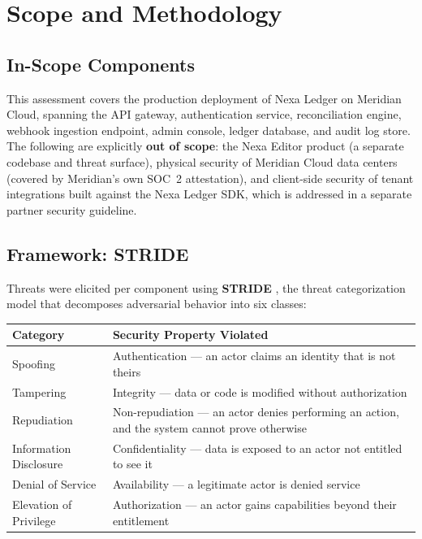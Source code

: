 \section{Scope and Methodology}
\label{sec:scope-methodology}

\subsection{In-Scope Components}

This assessment covers the production deployment of Nexa Ledger on Meridian Cloud, spanning the API gateway, authentication service, reconciliation engine, webhook ingestion endpoint, admin console, ledger database, and audit log store. The following are explicitly \textbf{out of scope}: the Nexa Editor product (a separate codebase and threat surface), physical security of Meridian Cloud data centers (covered by Meridian's own SOC~2 attestation), and client-side security of tenant integrations built against the Nexa Ledger SDK, which is addressed in a separate partner security guideline.

\subsection{Framework: STRIDE}

Threats were elicited per component using \textbf{STRIDE} \cite{stride_shostack}, the threat categorization model that decomposes adversarial behavior into six classes:

\begin{center}
\begin{tabularx}{0.95\linewidth}{@{}l L@{}}
\toprule
\textbf{Category} & \textbf{Security Property Violated} \\
\midrule
Spoofing & Authentication --- an actor claims an identity that is not theirs \\
Tampering & Integrity --- data or code is modified without authorization \\
Repudiation & Non-repudiation --- an actor denies performing an action, and the system cannot prove otherwise \\
Information Disclosure & Confidentiality --- data is exposed to an actor not entitled to see it \\
Denial of Service & Availability --- a legitimate actor is denied service \\
Elevation of Privilege & Authorization --- an actor gains capabilities beyond their entitlement \\
\bottomrule
\end{tabularx}
\end{center}

